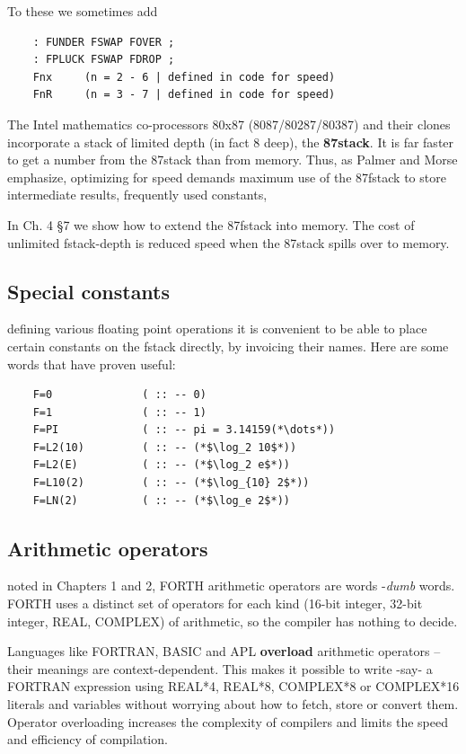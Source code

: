 To these we sometimes add

\begin{lstlisting}
    : FUNDER FSWAP FOVER ;
    : FPLUCK FSWAP FDROP ;
    Fnx     (n = 2 - 6 | defined in code for speed)
    FnR     (n = 3 - 7 | defined in code for speed)
\end{lstlisting}

The Intel mathematics co-processors 80x87 (8087/80287/80387) 
and their clones incorporate a stack of limited depth (in fact 8
deep), the \textbf{87stack}. It is far faster to get a number from the 87stack
than from memory. Thus, as Palmer and Morse emphasize,
optimizing for speed demands maximum use of the 87fstack to store intermediate
results, frequently used constants, \etc

In Ch. 4 \S7 we show how to extend the 87fstack into memory. The
cost of unlimited fstack-depth is reduced speed when the 87stack
spills over to memory.

\subsection{Special constants}
 defining various floating point operations it is convenient to be
able to place certain constants on the fstack directly, by invoicing
their names. Here are some words that have proven useful:
\begin{lstlisting}
    F=0              ( :: -- 0)
    F=1              ( :: -- 1)
    F=PI             ( :: -- pi = 3.14159(*\dots*))
    F=L2(10)         ( :: -- (*$\log_2 10$*))
    F=L2(E)          ( :: -- (*$\log_2 e$*))
    F=L10(2)         ( :: -- (*$\log_{10} 2$*))
    F=LN(2)          ( :: -- (*$\log_e 2$*))
\end{lstlisting}
 
\subsection{Arithmetic operators}
noted in Chapters 1 and 2, FORTH arithmetic operators are words -\textit{dumb} words. FORTH uses a distinct set of operators for each kind (16-bit integer, 32-bit integer, REAL, COMPLEX) of arithmetic, so the compiler has nothing to decide.

Languages like FORTRAN, BASIC and APL \textbf{overload} arithmetic operators -- their meanings are context-dependent. This makes it possible to write -say- a FORTRAN expression using REAL*4, REAL*8, COMPLEX*8 or COMPLEX*16 literals and variables without worrying about how to fetch, store or convert them. Operator overloading increases the complexity of compilers and limits the speed and efficiency of compilation.

